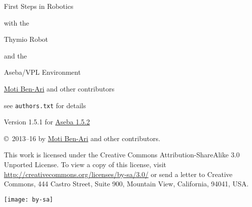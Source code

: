 
\thispagestyle{empty}

\begin{center}
\begin{Huge}
\begin{bfseries}
First Steps in Robotics
\end{bfseries}

with the

\begin{bfseries}
Thymio Robot
\end{bfseries}

and the

\begin{bfseries}
Aseba/VPL Environment
\end{bfseries}

\end{Huge}

\vskip 2cm

\begin{LARGE}
\href{http://www.weizmann.ac.il/sci-tea/benari/}{Moti Ben-Ari} and other contributors\\
\end{LARGE}
\bigskip
\begin{Large}
see \texttt{authors.txt} for details
\end{Large}

\vskip 1cm

\begin{Large}
Version 1.5.1 for \href{https://www.thymio.org/en:downloadinstall}{Aseba 1.5.2}
\end{Large}

\end{center}

\vfill

\begin{center}
\copyright{}\  2013--16 by \href{http://www.weizmann.ac.il/sci-tea/benari/}{Moti Ben-Ari} and other contributors.
\end{center}

This work is licensed under the Creative Commons
Attribution-ShareAlike 3.0 Unported License. To view a copy
of this license, visit
\href{http://creativecommons.org/licenses/by-sa/3.0/}{http://creativecommons.org/licenses/by-sa/3.0/}
or send a letter to Creative Commons, 444 Castro Street, Suite 900,
Mountain View, California, 94041, USA.

\begin{center}
\texttt{[image: by-sa]}
\end{center}

\newpage
\thispagestyle{empty}
\begin{spacing}{0.7}
\tableofcontents
\end{spacing}
\newpage
